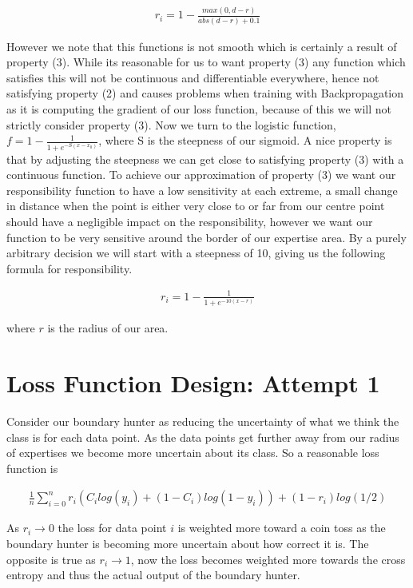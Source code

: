 \documentclass[notitlepage]{report}
\theoremstyle{definition}
\begin{document}
\begin{align}
r_i = 1 - \frac{max(0, d-r)}{abs(d-r) + 0.1}
\end{align}

However we note that this functions is not smooth which is certainly a result of property (3). While its reasonable for us to want property (3) any function which satisfies this will not be continuous and differentiable everywhere, hence not satisfying property (2) and causes problems when training with Backpropagation as it is computing the gradient of our loss function, because of this we will not strictly consider property (3). Now we turn to the logistic function, $f = 1 - \frac{1}{1 + e^{-S(x - x_0)}}$, where S is the steepness of our sigmoid. A nice property is that by adjusting the steepness we can get close to satisfying property (3) with a continuous function. To achieve our approximation of property (3) we want our responsibility function to have a low sensitivity at each extreme, a small change in distance when the point is either very close to or far from our centre point should have a negligible impact on the responsibility, however we want our function to be very sensitive around the border of our expertise area. By a purely arbitrary decision we will start with a steepness of 10, giving us the following formula for responsibility.

\begin{align}
r_i = 1 - \frac{1}{1 + e^{-10(x-r)}}
\end{align}

where $r$ is the radius of our area.


\section{Loss Function Design: Attempt 1}
Consider our boundary hunter as reducing the uncertainty of what we think the class is for each data point. As the data points get further away from our radius of expertises we become more uncertain about its class. So a reasonable loss function is 

\begin{align}
\frac{1}{n} \sum_{i=0}^n r_i(C_i log(y_i) + (1-C_i)log(1-y_i)) + (1-r_i) log(1/2)
\end{align}

As $r_i \rightarrow 0$ the loss for data point $i$ is weighted more toward a coin toss as the boundary hunter is becoming more uncertain about how correct it is. The opposite is true as $r_i \rightarrow 1$, now the loss becomes weighted more towards the cross entropy and thus the actual output of the boundary hunter.
\end{document}
